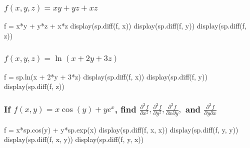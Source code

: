 \documentclass[
  letterpaper,
  DIV=11,
  numbers=noendperiod]{scrartcl}
\newenvironment{Shaded}{\begin{snugshade}}{\end{snugshade}}
\newcommand{\NormalTok}[1]{\textcolor[rgb]{0.00,0.23,0.31}{#1}}
\begin{document}
\subsubsection{\texorpdfstring{\(f(x, y, z) = xy+yz+xz\)}{f(x, y, z) = xy+yz+xz}}\label{fx-y-z-xyyzxz}

\begin{Shaded}
\begin{Highlighting}[numbers=left,,]
\NormalTok{f = x*y + y*z + x*z}
\NormalTok{display(sp.diff(f, x))}
\NormalTok{display(sp.diff(f, y))}
\NormalTok{display(sp.diff(f, z))}
\end{Highlighting}
\end{Shaded}

\subsubsection{\texorpdfstring{\(f(x, y, z) = \ln(x + 2y + 3z)\)}{f(x, y, z) = \textbackslash ln(x + 2y + 3z)}}\label{fx-y-z-lnx-2y-3z}

\begin{Shaded}
\begin{Highlighting}[numbers=left,,]
\NormalTok{f = sp.ln(x + 2*y + 3*z)}
\NormalTok{display(sp.diff(f, x))}
\NormalTok{display(sp.diff(f, y))}
\NormalTok{display(sp.diff(f, z))}
\end{Highlighting}
\end{Shaded}

\subsubsection{\texorpdfstring{If \(f(x,y) = x\cos(y)+ye^x\), find
\(\frac{\partial^2 f}{\partial x^2}, \frac{\partial^2 f}{\partial y^2}, \frac{\partial^2 f}{\partial x \partial y},\)
and
\(\frac{\partial^2 f}{\partial y \partial x}\)}{If f(x,y) = x\textbackslash cos(y)+ye\^{}x, find \textbackslash frac\{\textbackslash partial\^{}2 f\}\{\textbackslash partial x\^{}2\}, \textbackslash frac\{\textbackslash partial\^{}2 f\}\{\textbackslash partial y\^{}2\}, \textbackslash frac\{\textbackslash partial\^{}2 f\}\{\textbackslash partial x \textbackslash partial y\}, and \textbackslash frac\{\textbackslash partial\^{}2 f\}\{\textbackslash partial y \textbackslash partial x\}}}\label{if-fxy-xcosyyex-find-fracpartial2-fpartial-x2-fracpartial2-fpartial-y2-fracpartial2-fpartial-x-partial-y-and-fracpartial2-fpartial-y-partial-x}

\begin{Shaded}
\begin{Highlighting}[numbers=left,,]
\NormalTok{f = x*sp.cos(y) + y*sp.exp(x)}
\NormalTok{display(sp.diff(f, x, x))}
\NormalTok{display(sp.diff(f, y, y))}
\NormalTok{display(sp.diff(f, x, y))}
\NormalTok{display(sp.diff(f, y, x))}
\end{Highlighting}
\end{Shaded}
\end{document}
